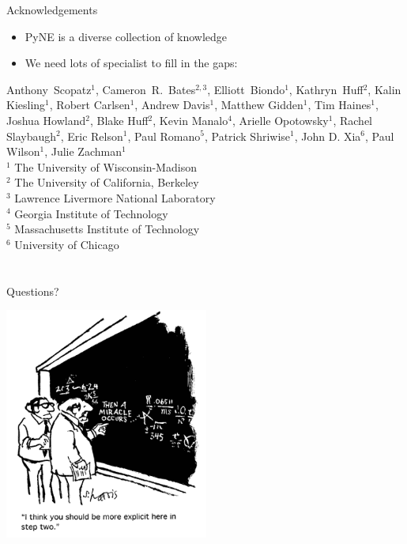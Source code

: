 \documentclass[xcolor=x11names,compress]{beamer}
\begin{document}
\begin{frame}[fragile]{Acknowledgements}
  \begin{itemize}
      \item PyNE is a diverse collection of knowledge
      \item We need lots of specialist to fill in the gaps:
  \end{itemize}

\small
  Anthony~Scopatz$^{1}$, Cameron~R.~Bates$^{2,3}$,
  Elliott~Biondo$^{1}$, Kathryn~Huff$^{2}$,
  Kalin Kiesling$^{1}$,
  Robert Carlsen$^{1}$,
  Andrew Davis$^{1}$,
  Matthew Gidden$^{1}$,
  Tim Haines$^{1}$,
  Joshua Howland$^{2}$,
  Blake Huff$^{2}$,
  Kevin Manalo$^{4}$,
  Arielle Opotowsky$^{1}$,
  Rachel Slaybaugh$^{2}$,
  Eric Relson$^{1}$,
  Paul Romano$^{5}$,
  Patrick Shriwise$^{1}$,
  John D. Xia$^{6}$,
  Paul Wilson$^{1}$,
  Julie Zachman$^{1}$\\
\vspace{0.2in}
\footnotesize
$^{1}$ The University of Wisconsin-Madison\\
$^{2}$ The University of California, Berkeley\\
$^{3}$ Lawrence Livermore National Laboratory\\
$^{4}$ Georgia Institute of Technology\\
$^{5}$ Massachusetts Institute of Technology\\
$^{6}$ University of Chicago

\end{frame}

\section*{}
\begin{frame}[fragile]{Questions?}

    \begin{center}
    \includegraphics[height=3in,clip]{questions-comic.png}
    \end{center}

\end{frame}
\end{document}
